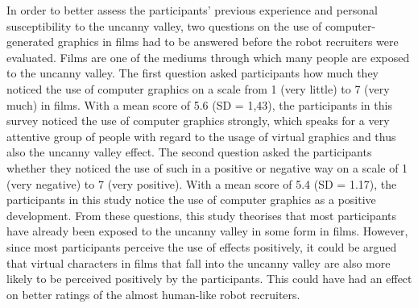 In order to better assess the participants' previous experience and personal susceptibility to the uncanny valley, two questions on the use of computer-generated graphics in films had to be answered before the robot recruiters were evaluated. Films are one of the mediums through which many people are exposed to the uncanny valley. The first question asked participants how much they noticed the use of computer graphics on a scale from 1 (very little) to 7 (very much) in films. With a mean score of 5.6 (SD = 1,43), the participants in this survey noticed the use of computer graphics strongly, which speaks for a very attentive group of people with regard to the usage of virtual graphics and thus also the uncanny valley effect. The second question asked the participants whether they noticed the use of such in a positive or negative way on a scale of 1 (very negative) to 7 (very positive). With a mean score of 5.4 (SD = 1.17), the participants in this study notice the use of computer graphics as a positive development. From these questions, this study theorises that most participants have already been exposed to the uncanny valley in some form in films. However, since most participants perceive the use of effects positively, it could be argued that virtual characters in films that fall into the uncanny valley are also more likely to be perceived positively by the participants. This could have had an effect on better ratings of the almost human-like robot recruiters.

